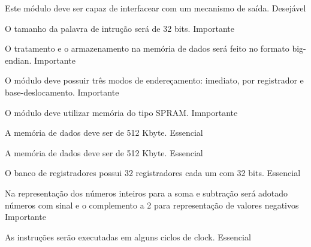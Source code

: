 	  \begin{nonfunctional}
	  	
	  {Este módulo deve ser capaz de interfacear com um mecanismo de saída.}
	  {Desejável}
	  
	  {O tamanho da palavra de intrução será de 32 bits.}
	  {Importante}
	  
        {O tratamento e o armazenamento na memória de dados será feito no formato big-endian.}
        {Importante}
        
        {O módulo deve possuir três modos de endereçamento: imediato, por registrador e base-deslocamento.}
        {Importante}
        
        {O módulo deve utilizar memória do tipo SPRAM.}
        {Imnportante}
        
        {A memória de dados deve ser de 512 Kbyte.}
        {Essencial}
        
        {A memória de dados deve ser de 512 Kbyte.}
        {Essencial}
        
        {O banco de registradores possui 32 registradores cada um com 32 bits.}
        {Essencial}
	  
		{Na representação dos números inteiros para a soma e subtração será adotado números com sinal e o complemento a 2 para representação de valores negativos}
		{Importante}
		
		{As instruções serão executadas em alguns ciclos de clock.}
		{Essencial}		
			  
	  \end{nonfunctional}